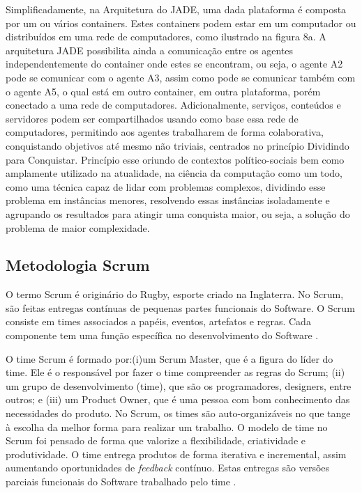 Simplificadamente, na Arquitetura do JADE, uma dada plataforma é composta por um ou vários containers. Estes containers podem estar em um computador ou distribuídos em uma rede de computadores, como ilustrado na figura 8a. A arquitetura JADE possibilita ainda a comunicação entre os agentes independentemente do container onde estes se encontram, ou seja, o agente A2 pode se comunicar com o agente A3, assim como pode se comunicar também com o agente A5, o qual está em outro container, em outra plataforma, porém conectado a uma rede de computadores. Adicionalmente, serviços, conteúdos e servidores podem ser compartilhados usando como base essa rede de computadores, permitindo aos agentes trabalharem de forma colaborativa, conquistando objetivos até mesmo não triviais, centrados no princípio Dividindo para Conquistar. Princípio esse oriundo de contextos político-sociais bem como amplamente utilizado na atualidade, na ciência da computação como um todo, como uma técnica capaz de lidar com problemas complexos, dividindo esse problema em instâncias menores, resolvendo essas instâncias isoladamente e agrupando os resultados para atingir uma conquista maior, ou seja, a solução do problema de maior complexidade.


\subsection{Metodologia Scrum}

O termo Scrum  é originário do Rugby, esporte criado na Inglaterra. No Scrum, são feitas entregas contínuas de pequenas partes funcionais do Software. O Scrum consiste em times associados a papéis, eventos, artefatos e regras. Cada componente tem uma função específica no desenvolvimento do Software \cite{schwaber2013}.

O time Scrum é formado por:(i)um Scrum Master, que é a figura do líder do time. Ele é o responsável por fazer o time compreender as regras do Scrum; (ii) um grupo de desenvolvimento (time), que são os programadores, designers, entre outros; e (iii) um Product Owner, que é uma pessoa com bom conhecimento das necessidades do produto. No Scrum, os times são auto-organizáveis no que tange à escolha da melhor forma para realizar um trabalho. O modelo de time no Scrum foi pensado de forma que valorize a flexibilidade, criatividade e produtividade.  O time entrega produtos de forma iterativa e incremental, assim aumentando oportunidades de \textit{feedback} contínuo. Estas entregas são versões parciais funcionais do Software trabalhado pelo time \cite[p. 5-7]{schwaber2013}.


